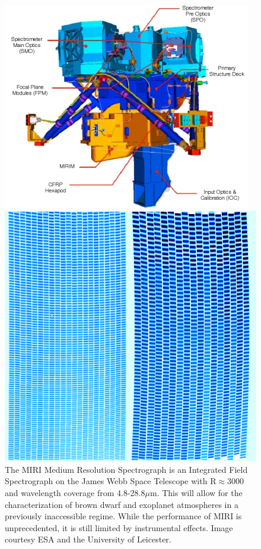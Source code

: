 \documentclass[]{article}
\begin{document}
\begin{figure}[h]
	\centering	
	\begin{minipage}{0.45\linewidth}
	\centering
	\vspace{-1em}
	\includegraphics[width=\linewidth]{MIRI.jpg}		
	\caption{The MIRI Medium Resolution Spectrograph \cite{Wells2015} is an Integrated Field Spectrograph on the James Webb Space Telescope with R$\approx$3000 and wavelength coverage from 4.8-28.8$\mu$m. This will allow for the characterization of brown dwarf and exoplanet atmospheres in a previously inaccessible regime. While the performance of MIRI is unprecedented, it is still limited by instrumental effects. Image courtesy ESA and the University of Leicester.}
	\end{minipage}
	\hspace{2em}
	\begin{minipage}{0.45\linewidth}
	\centering
	\includegraphics[width=0.95\linewidth]{CVFringeFlat.png}	

\end{minipage}
\end{figure}
\end{document}
